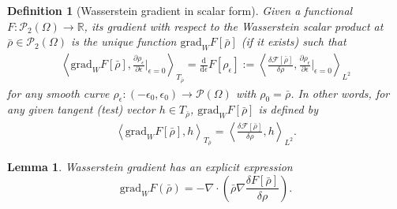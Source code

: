 \documentclass[11pt]{book}
\newtheorem{lemma}[theorem]{Lemma}
\newtheorem{definition}[theorem]{Definition}
\begin{document}
\begin{definition}[Wasserstein gradient in scalar form]
Given a functional \( F : \mathcal{P}_2(\Omega) \to \mathbb{R} \), 
its gradient with respect to the Wasserstein scalar product at \( \bar{\rho} \in \mathcal{P}_2(\Omega) \) 
is the unique function \( \mathrm{grad}_{W} F[\bar{\rho}] \) (if it exists) such that
\begin{align}
    \left\langle \mathrm{grad}_{W} F[\bar{\rho}], \frac{\partial \rho_\epsilon}{\partial \epsilon} 
    \bigg|_{\epsilon=0} \right\rangle_{T_{\bar{\rho}}} 
    = \frac{\mathrm{d}}{\mathrm{d}\epsilon} F[\rho_\epsilon]:= \left\langle \frac{\delta \mathcal{F}[\bar{\rho}]}{\delta \rho},
    \frac{\partial \rho_\epsilon}{\partial \epsilon} \bigg|_{\epsilon=0} \right\rangle_{L^2}
\end{align}
for any smooth curve \( \rho_\epsilon : (-\epsilon_0, \epsilon_0) \to \mathcal{P}(\Omega) \) with \( \rho_0 = \bar{\rho} \). In other words, for any given tangent (test) vector $h\in T_{\bar{\rho}}$, \( \mathrm{grad}_{W} F[\bar{\rho}] \) is defined by
\begin{align}
    \left\langle \mathrm{grad}_{W} F[\bar{\rho}], h \right\rangle_{T_{\bar{\rho}}} = \left\langle \frac{\delta \mathcal{F}[\bar{\rho}]}{\delta \rho},
    h \right\rangle_{L^2}.
\end{align}
\end{definition}

\begin{lemma}
Wasserstein gradient has an explicit expression
\[
\mathrm{grad}_W F(\bar{\rho}) = -\nabla \cdot \left(  \bar{\rho} \nabla \frac{\delta F[\bar{\rho}]}{\delta \rho}  \right).
\]
\end{lemma}
\end{document}
